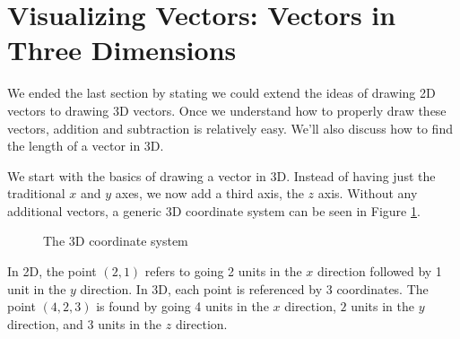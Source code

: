 \section{Visualizing Vectors: Vectors in Three Dimensions}\label{sec:geom_2}


We ended the last section by stating we could extend the ideas of drawing 2D vectors to drawing 3D vectors. Once we understand how to properly draw these vectors, addition and subtraction is relatively easy. We'll also discuss how to find the length of a vector in 3D. 

We start with the basics of drawing a vector in 3D. Instead of having just the traditional $x$ and $y$ axes, we now add a third axis, the $z$ axis. Without any additional vectors, a generic 3D coordinate system can be seen in Figure \ref{fig:empty_3D}.

\begin{figure}[h!]
\begin{center}
\end{center}
\caption{The 3D coordinate system}
\label{fig:empty_3D}
\end{figure}

In 2D, the point $(2,1)$ refers to going 2 units in the $x$ direction followed by 1 unit in the $y$ direction. In 3D, each point is referenced by 3 coordinates. The point $(4,2,3)$ is found by going 4 units in the $x$ direction, $2$ units in the $y$ direction, and 3 units in the $z$ direction. 

